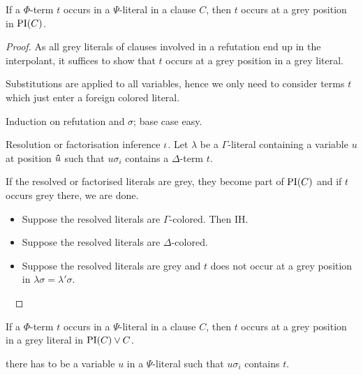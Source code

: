 \documentclass[,%
	draft=false,%
	numbers=noendperiod
	12pt,
	a4paper,
	oneside,%
	openany,
]{memoir}
\begin{document}
\begin{rlemma}
	If a $\Phi$-term $t$ occurs in a $\Psi$-literal in a clause $C$, then $t$ occurs at a grey position in $\operatorname{PI}(C)$.
\end{rlemma}
\begin{proof}
	As all grey literals of clauses involved in a refutation end up in the interpolant, it suffices to show that $t$ occurs at a grey position in a grey literal. 

	Substitutions are applied to all variables, hence we only need to consider terms $t$ which just enter a foreign colored literal.



	Induction on refutation and $\sigma$; base case easy.

	Resolution or factorisation inference $\iota$. 
	Let $\lambda$ be a $\Gamma$-literal containing a variable $u$ at position $\bm\hat u$ such that $u\sigma_i$ contains a $\Delta$-term $t$.

	If the resolved or factorised literals are grey, they become part of $\operatorname{PI}(C)$ and if $t$ occurs grey there, we are done.

	\begin{itemize}
		\item Suppose the resolved literals are $\Gamma$-colored. Then IH.
		\item Suppose the resolved literals are $\Delta$-colored.
			\mytodo{}
		\item Suppose the resolved literals are grey and $t$ does not occur at a grey position in $\lambda\sigma = \lambda'\sigma$.

			\mytodo{}

	\end{itemize}


	~



	
\end{proof}

\begin{clemma}
	If a $\Phi$-term $t$ occurs in a $\Psi$-literal in a clause $C$, then $t$ occurs at a grey position in a grey literal in $\operatorname{PI}(C) \lor C$.
\end{clemma}
there has to be a variable $u$ in a $\Psi$-literal such that $u\sigma_i$ contains $t$.
\end{document}
